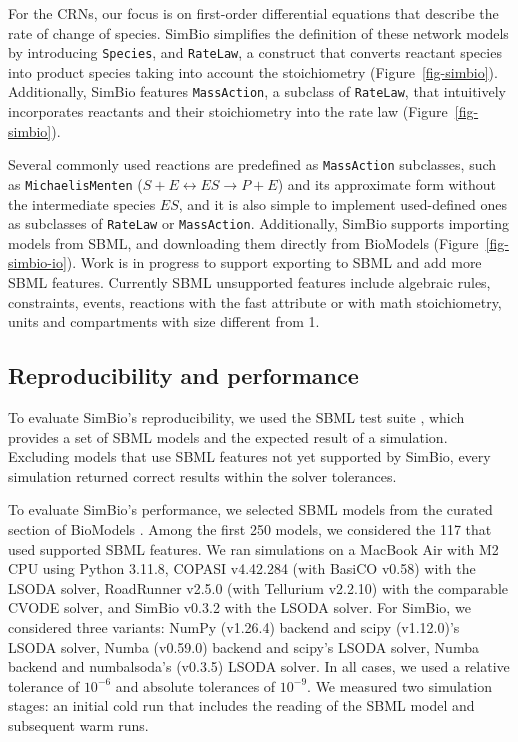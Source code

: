 \documentclass[namedate,numsec,webpdf,modern,large]{oup-authoring-template}
\theoremstyle{thmstyleone}%
\theoremstyle{thmstyletwo}%
\theoremstyle{thmstylethree}%
\begin{document}
For the \acp{CRN},
our focus is on first-order differential equations that describe the rate of change of species.
SimBio simplifies the definition of these network models by introducing \texttt{Species},
and \texttt{RateLaw}, a construct that converts reactant species into product species taking into account the stoichiometry (Figure~\ref{fig-simbio}).
Additionally, SimBio features \texttt{MassAction},
a subclass of \texttt{RateLaw},
that intuitively incorporates reactants and their stoichiometry into the rate law (Figure~\ref{fig-simbio}).

Several commonly used reactions are predefined as \texttt{MassAction} subclasses,
such as \texttt{MichaelisMenten} (\(S + E \leftrightarrow ES \rightarrow P + E\))
and its approximate form without the intermediate species \(ES\),
and it is also simple to implement used-defined ones
as subclasses of \texttt{RateLaw} or \texttt{MassAction}.
Additionally, SimBio supports importing models from \ac{SBML},
and downloading them directly from BioModels \cite{malik-sheriffBioModels15Years2020} (Figure~\ref{fig-simbio-io}).
Work is in progress to support exporting to \ac{SBML} and add more \ac{SBML} features.
Currently \ac{SBML} unsupported features include
algebraic rules, constraints, events, reactions with the fast attribute or with math stoichiometry,
units and compartments with size different from 1.

\subsection{Reproducibility and performance}
\label{reproducibility-and-performance}

To evaluate SimBio's reproducibility,
we used the \ac{SBML} test suite \cite{SBMLTestSuite},
which provides a set of \ac{SBML} models
and the expected result of a simulation.
Excluding models that use \ac{SBML} features not yet supported by SimBio,
every simulation returned correct results within the solver tolerances.

To evaluate SimBio's performance,
we selected \ac{SBML} models from the curated section of BioModels \cite{malik-sheriffBioModels15Years2020}.
Among the first 250 models,
we considered the 117 that used supported \ac{SBML} features.
We ran simulations
on a MacBook Air with M2 CPU
using Python 3.11.8,
COPASI v4.42.284
(with BasiCO v0.58) with the LSODA solver,
RoadRunner v2.5.0 (with Tellurium v2.2.10) with the comparable CVODE solver, and
SimBio v0.3.2 with the LSODA solver.
For SimBio, we considered three variants:
NumPy (v1.26.4) backend and scipy (v1.12.0)'s LSODA solver,
Numba (v0.59.0) backend and scipy's LSODA solver,
Numba backend and numbalsoda's (v0.3.5) LSODA solver.
In all cases, we used a relative tolerance of \(10^{-6}\) and absolute tolerances of \(10^{-9}\).
We measured two simulation stages:
an initial cold run that includes the reading of the \ac{SBML} model
and subsequent warm runs.
\end{document}
